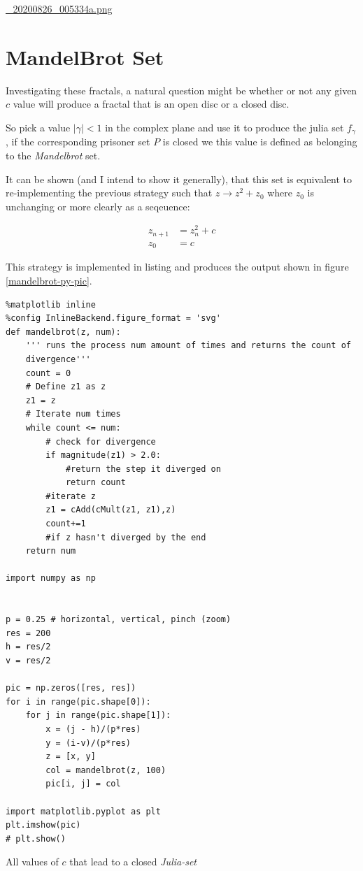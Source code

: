 \documentclass[11pt]{article}
\begin{document}
\url{\_20200826\_005334a.png}

\section{MandelBrot Set}
\label{sec:org4275c56}
Investigating these fractals, a natural question might be whether or not any
given \(c\) value will produce a fractal that is an open disc or a closed disc.

So pick a value \(\left\lvert \gamma \right \rvert < 1\) in the complex plane and
use it to produce the julia set \(f_{\gamma}\), if the corresponding prisoner set
\(P\) is closed we this value is defined as belonging to the \emph{Mandelbrot} set.

It can be shown (and I intend to show it generally), that this set is equivalent to re-implementing the previous strategy such that \(z \rightarrow z^{2} + z_{0}\) where \(z_{0}\) is unchanging or more clearly as a seqeuence:

\begin{align}
z_{n+1} &= z^{2}_n + c \label{eq:mb-sequence} \\
z_{0}   &= c
\end{align}

This strategy is implemented in listing and produces the output shown in figure \ref{mandelbrot-py-pic}.

\begin{listing}[htbp]
\begin{verbatim}
%matplotlib inline
%config InlineBackend.figure_format = 'svg'
def mandelbrot(z, num):
    ''' runs the process num amount of times and returns the count of
    divergence'''
    count = 0
    # Define z1 as z
    z1 = z
    # Iterate num times
    while count <= num:
        # check for divergence
        if magnitude(z1) > 2.0:
            #return the step it diverged on
            return count
        #iterate z
        z1 = cAdd(cMult(z1, z1),z)
        count+=1
        #if z hasn't diverged by the end
    return num

import numpy as np


p = 0.25 # horizontal, vertical, pinch (zoom)
res = 200
h = res/2
v = res/2

pic = np.zeros([res, res])
for i in range(pic.shape[0]):
    for j in range(pic.shape[1]):
        x = (j - h)/(p*res)
        y = (i-v)/(p*res)
        z = [x, y]
        col = mandelbrot(z, 100)
        pic[i, j] = col

import matplotlib.pyplot as plt
plt.imshow(pic)
# plt.show()
\end{verbatim}
\caption{\label{py-mandelbrot-code}All values of \(c\) that lead to a closed \emph{Julia-set}}
\end{listing}
\end{document}
